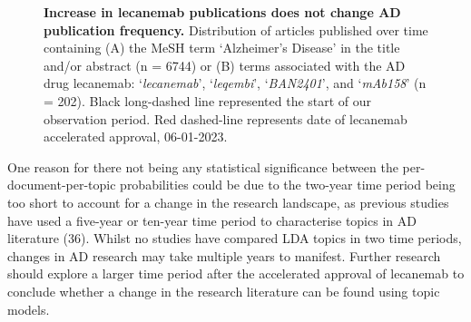 \documentclass[
  a4paper,
]{article}
\begin{document}
\begin{figure}
\begin{minipage}[t]{0.50\linewidth}
{\begin{figure}[H]
\end{figure}

}

\end{minipage}%

\caption{\label{fig-publication-date}\textbf{Increase in lecanemab
publications does not change AD publication frequency.} Distribution of
articles published over time containing (A) the MeSH term `Alzheimer's
Disease' in the title and/or abstract (n = 6744) or (B) terms associated
with the AD drug lecanemab: `\emph{lecanemab}', `\emph{leqembi}',
`\emph{BAN2401}', and `\emph{mAb158}' (n = 202). Black long-dashed line
represented the start of our observation period. Red dashed-line
represents date of lecanemab accelerated approval, 06-01-2023.}

\end{figure}

\newpage{}

One reason for there not being any statistical significance between the
per-document-per-topic probabilities could be due to the two-year time
period being too short to account for a change in the research
landscape, as previous studies have used a five-year or ten-year time
period to characterise topics in AD literature (36). Whilst no studies
have compared LDA topics in two time periods, changes in AD research may
take multiple years to manifest. Further research should explore a
larger time period after the accelerated approval of lecanemab to
conclude whether a change in the research literature can be found using
topic models.
\end{document}
